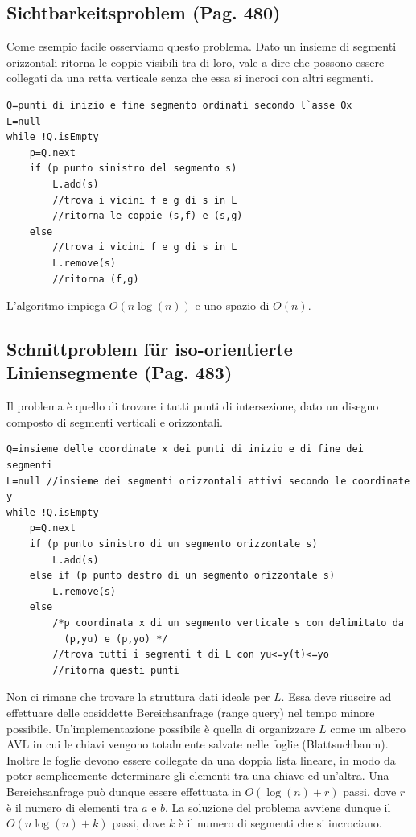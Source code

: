 \documentclass[a4paper]{book}
\newcommand{\lstIndent}{4}
\begin{document}
\subsection{Sichtbarkeitsproblem (Pag. 480)}
Come esempio facile osserviamo questo problema. Dato un insieme di segmenti orizzontali ritorna le coppie visibili tra di loro, vale a dire che possono essere collegati da una retta verticale senza che essa si incroci con altri segmenti.
\begin{lstlisting}[tabsize=\lstIndent]
Q=punti di inizio e fine segmento ordinati secondo l`asse Ox
L=null
while !Q.isEmpty
	p=Q.next
	if (p punto sinistro del segmento s)
		L.add(s)
		//trova i vicini f e g di s in L
		//ritorna le coppie (s,f) e (s,g)
	else
		//trova i vicini f e g di s in L	
		L.remove(s)
		//ritorna (f,g)
\end{lstlisting}
L'algoritmo impiega $O(n \log (n))$ e uno spazio di $O(n)$.
\subsection{Schnittproblem für iso-orientierte Liniensegmente (Pag. 483)}
Il problema è quello di trovare i tutti punti di intersezione, dato un disegno composto di segmenti verticali e orizzontali.
\begin{lstlisting}[tabsize=\lstIndent]
Q=insieme delle coordinate x dei punti di inizio e di fine dei segmenti
L=null //insieme dei segmenti orizzontali attivi secondo le coordinate y
while !Q.isEmpty
	p=Q.next
	if (p punto sinistro di un segmento orizzontale s)
		L.add(s)
	else if (p punto destro di un segmento orizzontale s)
		L.remove(s)
	else 
		/*p coordinata x di un segmento verticale s con delimitato da
		  (p,yu) e (p,yo) */
		//trova tutti i segmenti t di L con yu<=y(t)<=yo
		//ritorna questi punti   		
\end{lstlisting}
Non ci rimane che trovare la struttura dati ideale per $L$. Essa deve riuscire ad effettuare delle cosiddette Bereichsanfrage (range query) nel tempo minore possibile. Un'implementazione possibile è quella di organizzare $L$ come un albero AVL in cui le chiavi vengono totalmente salvate nelle foglie (Blattsuchbaum). Inoltre le foglie devono essere collegate da una doppia lista lineare, in modo da poter semplicemente determinare gli elementi tra una chiave ed un'altra.
Una Bereichsanfrage può dunque essere effettuata in $O(\log (n)+r)$ passi, dove $r$ è il numero di elementi tra $a$ e $b$. La soluzione del problema avviene dunque il $O(n\log (n)+k)$ passi, dove $k$ è il numero di segmenti che si incrociano.
\end{document}
